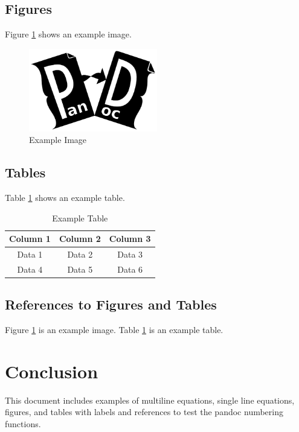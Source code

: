 \documentclass{article}
\begin{document}
\subsection{Figures}
Figure \ref{fig:example} shows an example image.

\begin{figure}[H]
    \centering
    \includegraphics[width=0.5\textwidth]{./example-image}
    \caption{Example Image}
    \label{fig:example}
\end{figure}

\subsection{Tables}
Table \ref{tab:example} shows an example table.

\begin{table}[H]
    \centering
    \begin{tabular}{|c|c|c|}
        \hline
        Column 1 & Column 2 & Column 3 \\
        \hline
        Data 1 & Data 2 & Data 3 \\
        Data 4 & Data 5 & Data 6 \\
        \hline
    \end{tabular}
    \caption{Example Table}
    \label{tab:example}
\end{table}

\subsection{References to Figures and Tables}
Figure \ref{fig:example} is an example image. Table \ref{tab:example} is an example table.

\section{Conclusion}
This document includes examples of multiline equations, single line equations, figures, and tables with labels and references to test the pandoc numbering functions.
\end{document}
